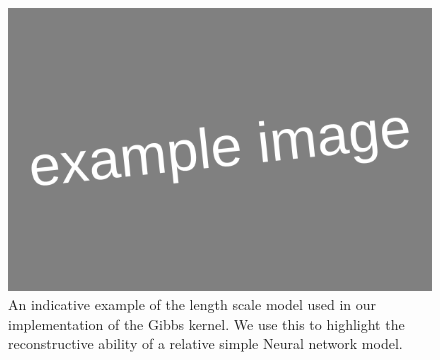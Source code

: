 \begin{figure}
	\centering
	\includegraphics[width=\textwidth]{example_image}
	\caption{An indicative example of the length scale model used in our implementation of the Gibbs kernel. We use this to highlight the reconstructive ability of a relative simple Neural network model.}
	\label{fig:gibbs_lengthscale}
\end{figure}